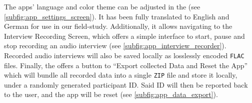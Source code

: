 The apps' language and color theme can be adjusted in the \settingsscreen (see \autoref{subfig:app_settings_screen}).
It has been fully translated to English and German for use in our field-study.
Additionally, it allows navigating to the \textsf{Interview Recording Screen}, which offers a simple interface to start, pause and stop recording an audio interview (see \autoref{subfig:app_interview_recorder}).
Recorded audio interviews will also be saved locally as losslessly encoded \texttt{FLAC} files.
Finally, the \settingsscreen offers a button to “Export collected Data and Reset the App” which will bundle all recorded data into a single \texttt{ZIP} file and store it locally, under a randomly generated participant ID.
Said ID will then be reported back to the user, and the app will be reset (see \autoref{subfig:app_data_export}).

